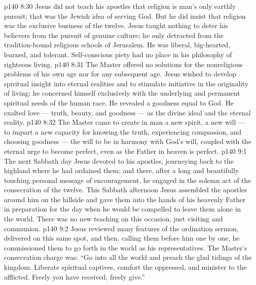 \vs p140 8:30 Jesus did not teach his apostles that religion is man’s only earthly pursuit; that was the Jewish idea of serving God. But he did insist that religion was the exclusive business of the twelve. Jesus taught nothing to deter his believers from the pursuit of genuine culture; he only detracted from the tradition\hyp{}bound religious schools of Jerusalem. He was liberal, big\hyp{}hearted, learned, and tolerant. Self\hyp{}conscious piety had no place in his philosophy of righteous living.
\vs p140 8:31 The Master offered no solutions for the nonreligious problems of his own age nor for any subsequent age. Jesus wished to develop spiritual insight into eternal realities and to stimulate initiative in the originality of living; he concerned himself exclusively with the underlying and permanent spiritual needs of the human race. He revealed a goodness equal to God. He exalted love --- truth, beauty, and goodness --- as the divine ideal and the eternal reality.
\vs p140 8:32 The Master came to create in man a new spirit, a new will --- to impart a new capacity for knowing the truth, experiencing compassion, and choosing goodness --- the will to be in harmony with God’s will, coupled with the eternal urge to become perfect, even as the Father in heaven is perfect.
\vs p140 9:1 The next Sabbath day Jesus devoted to his apostles, journeying back to the highland where he had ordained them; and there, after a long and beautifully touching personal message of encouragement, he engaged in the solemn act of the consecration of the twelve. This Sabbath afternoon Jesus assembled the apostles around him on the hillside and gave them into the hands of his heavenly Father in preparation for the day when he would be compelled to leave them alone in the world. There was no new teaching on this occasion, just visiting and communion.
\vs p140 9:2 Jesus reviewed many features of the ordination sermon, delivered on this same spot, and then, calling them before him one by one, he commissioned them to go forth in the world as his representatives. The Master’s consecration charge was: \textcolor{ubdarkred}{“Go into all the world and preach the glad tidings of the kingdom. Liberate spiritual captives, comfort the oppressed, and minister to the afflicted. Freely you have received, freely give.”}
